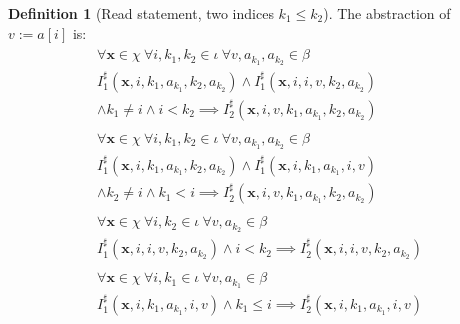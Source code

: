 \documentclass[a4paper]{article}
\newcommand{\ve}[1]{\mathbf{#1}}
\newcommand{\vx}{\ve{x}}
\newcommand{\abstr}[1]{#1^\sharp}
\theoremstyle{definition}
\newtheorem{definition}{Definition}
\theoremstyle{plain}
\newcommand{\rulespacing}{\\[0.4em]}
\begin{document}
\begin{definition}[Read statement, two indices $k_1 \leq k_2$]\label{def:read2}
The abstraction of $v := a[i]$ is:
{\small\begin{align}
\begin{aligned}
\forall \vx \in \chi~ \forall i,k_1,k_2\in\iota~ \forall v,a_{k_1},a_{k_2} \in \beta\\
  \abstr{I}_1(\vx, i, k_1, a_{k_1}, k_2, a_{k_2}) \land
  \abstr{I}_1(\vx, i, i, v, k_2, a_{k_2}) \\ \land
  k_1 \neq i \land i < k_2 \implies
  \abstr{I}_2(\vx, i, v, k_1, a_{k_1}, k_2, a_{k_2})
\end{aligned} \label{rule:read2_begin}\\
\begin{aligned}
\forall \vx \in \chi~ \forall i,k_1,k_2\in\iota~ \forall v,a_{k_1},a_{k_2} \in \beta \\
  \abstr{I}_1(\vx, i, k_1, a_{k_1}, k_2, a_{k_2}) \land
  \abstr{I}_1(\vx, i, k_1, a_{k_1}, i, v) \\ \land
  k_2 \neq i \land k_1 < i \implies
  \abstr{I}_2(\vx, i, v, k_1, a_{k_1}, k_2, a_{k_2})
\end{aligned}\rulespacing
\begin{aligned}
\forall \vx \in \chi~ \forall i,k_2\in\iota~ \forall v,a_{k_2} \in \beta \\
  \abstr{I}_1(\vx, i, i, v, k_2, a_{k_2}) \land i < k_2 \implies
  \abstr{I}_2(\vx, i, i, v, k_2, a_{k_2})
\end{aligned}\rulespacing
\begin{aligned}
\forall \vx \in \chi~ \forall i,k_1\in\iota~ \forall v,a_{k_1} \in \beta \\
  \abstr{I}_1(\vx, i, k_1, a_{k_1}, i, v) \land k_1 \leq i \implies
  \abstr{I}_2(\vx, i, k_1, a_{k_1}, i, v)
\end{aligned}\label{rule:read2_end}
\end{align}} 
\end{definition}
\end{document}
